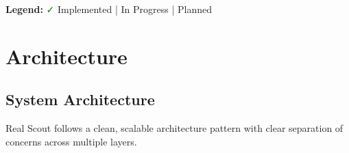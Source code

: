 \documentclass[11pt,a4paper,oneside]{book}
\begin{document}
\textbf{Legend:} \textcolor{green}{\faCheck} Implemented | \textcolor{orange}{\faCog} In Progress | \textcolor{blue}{\faClock} Planned

\chapter{Architecture}

\section{System Architecture}

Real Scout follows a clean, scalable architecture pattern with clear separation of concerns across multiple layers.
\end{document}
